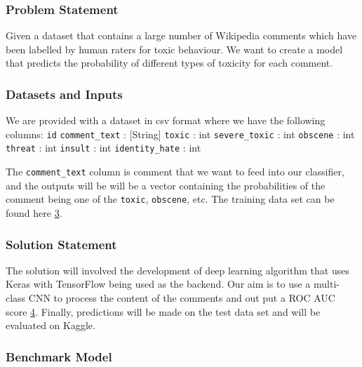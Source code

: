 \hypertarget{problem-statement}{%
\subsubsection{Problem Statement}\label{problem-statement}}

Given a dataset that contains a large number of Wikipedia comments which
have been labelled by human raters for toxic behaviour. We want to
create a model that predicts the probability of different types of
toxicity for each comment.

\hypertarget{datasets-and-inputs}{%
\subsubsection{Datasets and Inputs}\label{datasets-and-inputs}}

We are provided with a dataset in csv format where we have the following
columns: \texttt{id} \texttt{comment\_text} : {[}String{]}
\texttt{toxic} : int \texttt{severe\_toxic} : int \texttt{obscene} : int
\texttt{threat} : int \texttt{insult} : int \texttt{identity\_hate} :
int

The \texttt{comment\_text} column is comment that we want to feed into
our classifier, and the outputs will be will be a vector containing the
probabilities of the comment being one of the \texttt{toxic},
\texttt{obscene}, etc. The training data set can be found here
\href{https://www.kaggle.com/c/8076/download/train.csv.zip}{3}.

\hypertarget{solution-statement}{%
\subsubsection{Solution Statement}\label{solution-statement}}

The solution will involved the development of deep learning algorithm
that uses Keras with TensorFlow being used as the backend. Our aim is to
use a multi-class CNN to process the content of the comments and out put
a ROC AUC score
\href{http://scikit-learn.org/stable/modules/generated/sklearn.metrics.roc_auc_score.html}{4}.
Finally, predictions will be made on the test data set and will be
evaluated on Kaggle.

\hypertarget{benchmark-model}{%
\subsubsection{Benchmark Model}\label{benchmark-model}}

